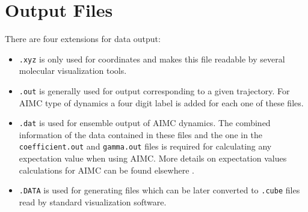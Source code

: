 \section{Output Files}

There are four extensions for data output:
\begin{itemize}
    \item \verb+.xyz+ is only used for coordinates and makes this file readable by several molecular visualization tools.
    \item \verb+.out+ is generally used for output corresponding to a given trajectory. For AIMC type of dynamics a four digit label is added for each one of these files.
    \item \verb+.dat+ is used for ensemble output of AIMC dynamics. The combined information of the data contained in these files and the one in the \verb+coefficient.out+ and \verb+gamma.out+ files is required for calculating any expectation value when using AIMC. More details on expectation values calculations for AIMC can be found elsewhere \cite{freixas2018ab}.
    \item \verb+.DATA+ is used for generating files which can be later converted to \verb+.cube+ files read by standard visualization software.
\end{itemize}

